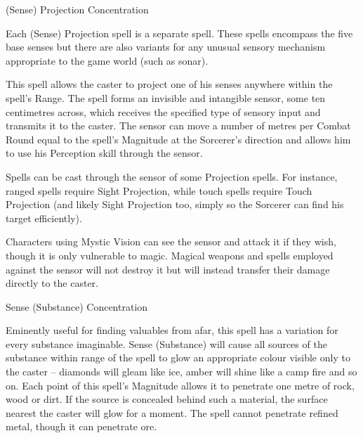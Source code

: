 \begin{samepage}
\begin{rpg-spell}
{(Sense) Projection}
{Concentration}

Each (Sense) Projection spell is a separate spell. These spells encompass the five base senses but there are also variants for any unusual sensory mechanism appropriate to the game world (such as sonar). 

This spell allows the caster to project one of his senses anywhere within the spell’s Range. The spell forms an invisible and intangible sensor, some ten centimetres across, which receives the specified type of sensory input and transmits it to the caster. The sensor can move a number of metres per Combat Round equal to the spell’s Magnitude at the Sorcerer’s direction and allows him to use his Perception skill through the sensor. 

Spells can be cast through the sensor of some Projection spells. For instance, ranged spells require Sight Projection, while touch spells require Touch Projection (and likely Sight Projection too, simply so the Sorcerer can find his target efficiently). 

Characters using Mystic Vision can see the sensor and attack it if they wish, though it is only vulnerable to magic. Magical weapons and spells employed against the sensor will not destroy it but will instead transfer their damage directly to the caster.
\end{rpg-spell}
\end{samepage}


\begin{samepage}
\begin{rpg-spell}
{Sense (Substance)}
{Concentration}

Eminently useful for finding valuables from afar, this spell has a variation for every substance imaginable. Sense (Substance) will cause all sources of the substance within range of the spell to glow an appropriate colour visible only to the caster – diamonds will gleam like ice, amber will shine like a camp fire and so on. Each point of this spell’s Magnitude allows it to penetrate one metre of rock, wood or dirt. If the source is concealed behind such a material, the surface nearest the caster will glow for a moment. The spell cannot penetrate refined metal, though it can penetrate ore. 
\end{rpg-spell}
\end{samepage}


